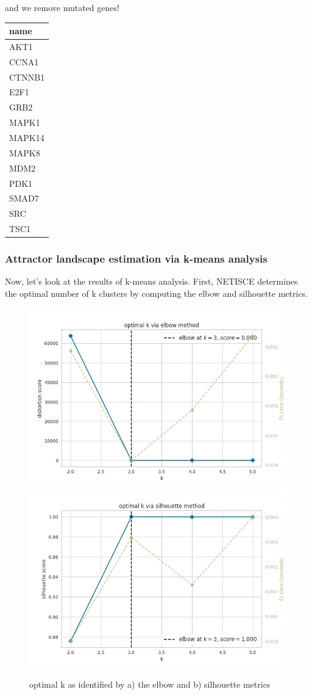 \documentclass[
]{book}
\begin{document}
and we remove mutated genes!

\begin{tabular}{l}
\hline
name\\
\hline
AKT1\\
\hline
CCNA1\\
\hline
CTNNB1\\
\hline
E2F1\\
\hline
GRB2\\
\hline
MAPK1\\
\hline
MAPK14\\
\hline
MAPK8\\
\hline
MDM2\\
\hline
PDK1\\
\hline
SMAD7\\
\hline
SRC\\
\hline
TSC1\\
\hline
\end{tabular}

\hypertarget{section-id}{%
\subsubsection*{Attractor landscape estimation via k-means analysis}\label{section-id}}

Now, let's look at the results of k-means analysis. First, NETISCE determines the optimal number of k clusters by computing the elbow and silhouette metrics.

\begin{figure}
\includegraphics[width=0.5\linewidth]{crc/results/elbow} \includegraphics[width=0.5\linewidth]{crc/results/silhouette} \caption{optimal k as identified by a) the elbow and b) silhouette metrics}\label{fig:unnamed-chunk-36}
\end{figure}
\end{document}
